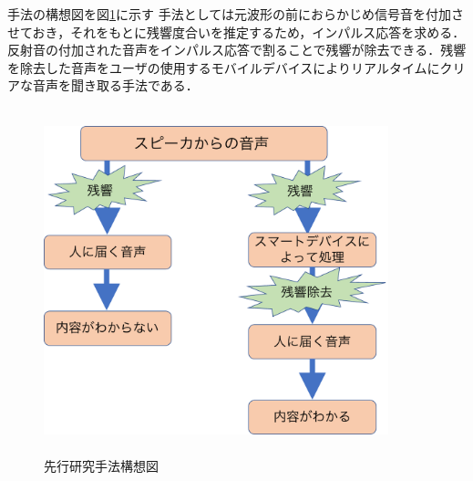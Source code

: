 \documentclass[a4j,11pt]{jsarticle}
\begin{document}
手法の構想図を図\ref{fig:手法構想図}に示す
手法としては元波形の前におらかじめ信号音を付加させておき，それをもとに残響度合いを推定するため，インパルス応答を求める．反射音の付加された音声をインパルス応答で割ることで残響が除去できる．残響を除去した音声をユーザの使用するモバイルデバイスによりリアルタイムにクリアな音声を聞き取る手法である．
\begin{figure}[h]
\begin{center}
 \includegraphics[clip,width=100mm,height=100mm]{risouzu.pdf}
\end{center}
 \caption{先行研究手法構想図}
 \label{fig:手法構想図}
\end{figure}

\end{document}
